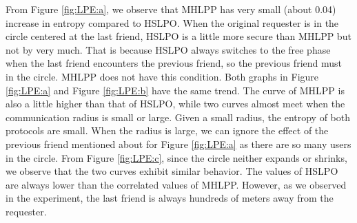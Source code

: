 From Figure \ref{fig:LPE:a}, we observe that MHLPP has very small (about 0.04) increase in entropy compared to HSLPO. When the original requester is in the circle centered at the last friend, HSLPO is a little more secure than MHLPP but not by very much. That is because HSLPO always switches to the free phase when the last friend encounters the previous friend, so the previous friend must in the circle. MHLPP does not have this condition. Both graphs in Figure \ref{fig:LPE:a} and Figure \ref{fig:LPE:b} have the same trend. The curve of MHLPP is also a little higher than that of HSLPO, while two curves almost meet when the communication radius is small or large. Given a small radius, the entropy of both protocols are small. When the radius is large, we can ignore the effect of the previous friend mentioned about for Figure \ref{fig:LPE:a} as there are so many users in the circle. From Figure \ref{fig:LPE:c}, since the circle neither expands or shrinks, we observe that the two curves exhibit similar behavior. The values of HSLPO are always lower than the correlated values of MHLPP. However, as we observed in the experiment, the last friend is always hundreds of meters away from the requester. 


